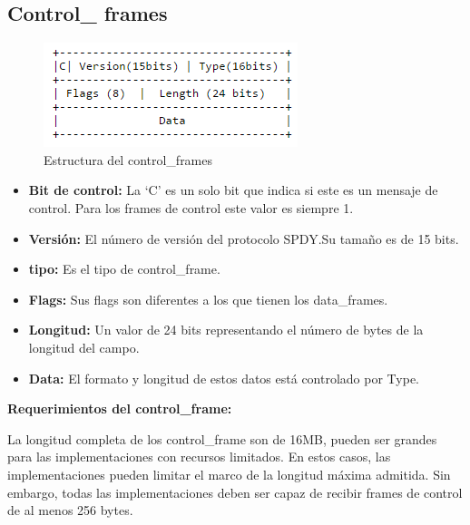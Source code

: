 \subsection{Control\_ frames}
\begin{figure}[H] %
\includegraphics[scale=1]{controlframes.png}  %
\centering
\caption{Estructura del control\_frames} \label{fig:figura1}
\end{figure}
\begin{itemize}
\item \textbf{Bit de control:} La ‘C’ es un solo bit que indica si este es un mensaje de control. Para los frames de control este valor es siempre 1.
\item \textbf{Versión:}  El número de versión del protocolo SPDY.Su tamaño es de 15 bits.
\item \textbf{tipo:} Es el tipo de control\_frame.
\item \textbf{Flags:} Sus flags son diferentes a los que tienen los data\_frames.
\item \textbf{Longitud:} Un valor de 24 bits representando el número de bytes de la longitud del campo.
\item \textbf{Data:} El formato y longitud de estos datos está controlado por  Type.
\end{itemize}
\textbf{Requerimientos del control\_frame:}

La longitud completa de los control\_frame son de 16MB, pueden ser grandes para las implementaciones con recursos limitados. En estos casos, las implementaciones pueden limitar el marco de la longitud máxima admitida. Sin embargo, todas las implementaciones deben ser capaz de recibir frames de control de al menos 256 bytes.

